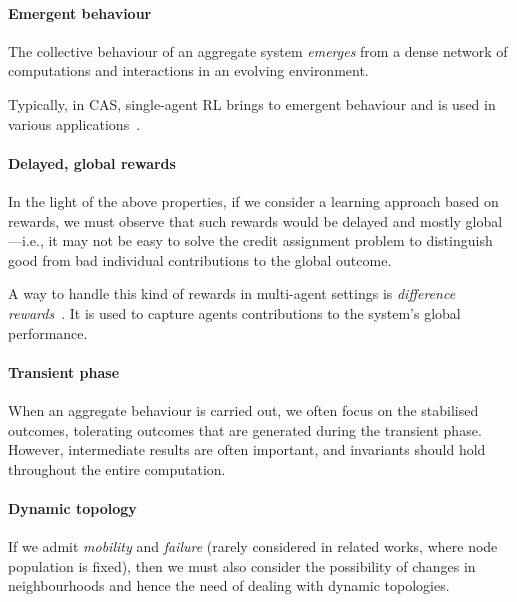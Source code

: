 \documentclass[conference]{IEEEtran}
\newcommand{\suggestions}[1]{\todo[inline, color=yellow]{#1}}
\begin{document}
%

\paragraph{Emergent behaviour}
%
The collective behaviour of an aggregate system
 \emph{emerges} 
 from a dense network of computations and interactions
 in an evolving environment.
%

Typically, in CAS, single-agent RL brings to emergent behaviour and is used in various applications~\cite{DBLP:conf/icse/DAngeloGGGNPT19}.

\paragraph{Delayed, global rewards}
%
In the light of the above properties,
 if we consider a learning approach based on rewards,
 we must observe that such rewards would be
 delayed and mostly global---i.e.,
 it may not be easy to solve the credit assignment problem
 to distinguish good from bad individual contributions
 to the global outcome.

A way to handle this kind of rewards in multi-agent settings is \textit{difference rewards}~\cite{DBLP:conf/atal/DevlinYKT14}. It is used to capture agents contributions to the system's global performance.
\paragraph{Transient phase}
%
When an aggregate behaviour is carried out,
 we often focus on the stabilised outcomes,
 tolerating outcomes that are generated
 during the transient phase.
%
However, intermediate results are often important,
 and invariants should hold throughout the entire computation.

\paragraph{Dynamic topology}
%
If we admit \emph{mobility} and \emph{failure} (rarely considered in related works, where node population is fixed),
 then we must also consider
 the possibility of changes in neighbourhoods
 and hence the need of dealing with dynamic topologies.
\end{document}
